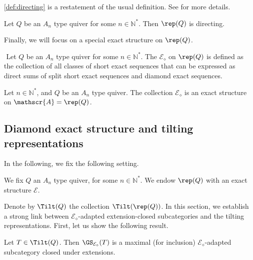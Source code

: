 \cref{def:directing} is a restatement of the usual definition. See \cite{ASS06} for more details.

\begin{theorem} \label{thm:Andirecting}
    Let $Q$ be an $A_n$ type quiver for some $n \in \mathbb{N}^*$. Then $\rep(Q)$ is directing.
\end{theorem}

Finally, we will focus on a special exact structure on $\rep(Q)$.

\begin{definition} \label{def:Ediamond}$ $
Let \( Q \) be an $A_n$ type quiver for some $n \in \mathbb{N}^*$. The  $\mathcal{E}_{\diamond}$ on $\rep(Q)$ is defined as the collection of all classes of short exact sequences that can be expressed as direct sums of split short exact sequences and diamond exact sequences.
\end{definition}

\begin{prop}
 \label{prop:EdiamondExactStructureTypeA}
     Let $n \in \mathbb{N}^*$, and $Q$ be an $A_n$ type quiver. The collection $\mathcal{E}_{\diamond}$ is an exact structure on $\mathscr{A} = \rep(Q)$.
 \end{prop}


\subsection{Diamond exact structure and tilting representations}
\label{ss:Diamond}
In the following, we fix the following setting.

\begin{conv}\label{conv:typeA}
    We fix $Q$ an $A_n$ type quiver, for some $n \in \mathbb{N}^*$. We endow $\rep(Q)$ with an exact structure $\mathcal{E}$.
\end{conv}

Denote by $\Tilt(Q)$ the collection $\Tilt(\rep(Q))$. In this section, we establish a strong link between $\mathcal{E}_\diamond$-adapted extension-closed subcategories and the tilting representations. First, let us show the following result.

\begin{theorem}
\label{thm:maximal}
 Let $T \in \Tilt(Q)$. Then $\GS_{\mathcal{E_\diamond}}(T)$ is a maximal (for inclusion) $\mathcal{E}_\diamond$-adapted subcategory closed under extensions.
\end{theorem}

